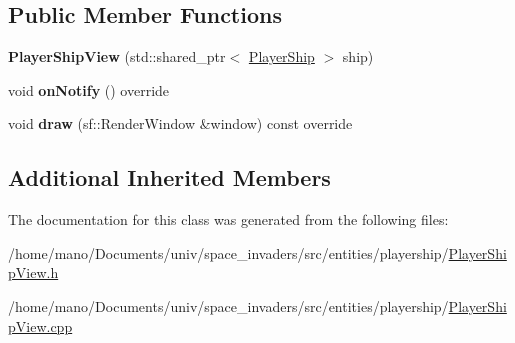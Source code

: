 \subsection*{Public Member Functions}
\begin{DoxyCompactItemize}
\item 
\mbox{\label{classentities_1_1playership_1_1PlayerShipView_a9f863260d81efc4cdfb213af754b5732}} 
{\bfseries Player\+Ship\+View} (std\+::shared\+\_\+ptr$<$ \hyperlink{classentities_1_1playership_1_1PlayerShip}{Player\+Ship} $>$ ship)
\item 
\mbox{\label{classentities_1_1playership_1_1PlayerShipView_a141c615a79dabf823243993f699cb039}} 
void {\bfseries on\+Notify} () override
\item 
\mbox{\label{classentities_1_1playership_1_1PlayerShipView_abce403c13058a9d56d8a668c4da659af}} 
void {\bfseries draw} (sf\+::\+Render\+Window \&window) const override
\end{DoxyCompactItemize}
\subsection*{Additional Inherited Members}


The documentation for this class was generated from the following files\+:\begin{DoxyCompactItemize}
\item 
/home/mano/\+Documents/univ/space\+\_\+invaders/src/entities/playership/\hyperlink{PlayerShipView_8h}{Player\+Ship\+View.\+h}\item 
/home/mano/\+Documents/univ/space\+\_\+invaders/src/entities/playership/\hyperlink{PlayerShipView_8cpp}{Player\+Ship\+View.\+cpp}\end{DoxyCompactItemize}
